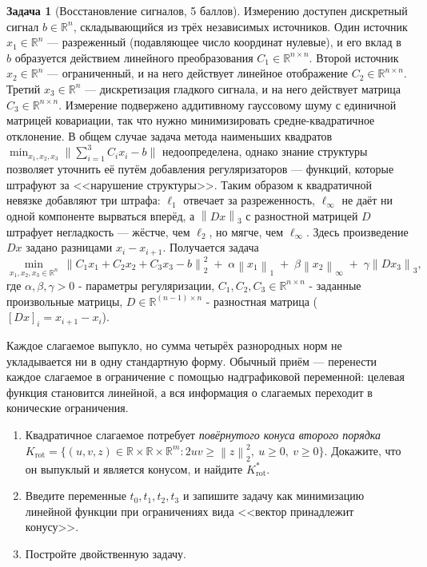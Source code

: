 \documentclass[11pt]{article}
\theoremstyle{definition}
\newtheorem{problem}{Задача}
\theoremstyle{starred}
\theoremstyle{definition}
\theoremstyle{remark}
\theoremstyle{plain}
\theoremstyle{definition}
\newcommand{\R}{\mathbb{R}}
\newcommand{\norm}[1]{\left\lVert #1 \right\rVert}
\begin{document}
\begin{problem}[Восстановление сигналов, 5 баллов]
Измерению доступен дискретный сигнал $b \in \R^n$, складывающийся из трёх независимых источников. Один источник $x_1  \in \R^n$ --- разреженный (подавляющее число координат нулевые), и его вклад в $b$ образуется действием линейного преобразования $C_1 \in \R^{n \times n}$. Второй источник $x_2  \in \R^n$ --- ограниченный, и на него действует линейное отображение $C_2  \in \R^{n \times n}$. Третий $x_3  \in \R^n$ --- дискретизация гладкого сигнала, и на него действует матрица $C_3  \in \R^{n \times n}$. Измерение подвержено аддитивному гауссовому шуму с единичной матрицей ковариации, так что нужно минимизировать средне-квадратичное отклонение. В общем случае задача метода наименьших квадратов $\min_{x_1, x_2, x_3} \|\sum_{i=1}^3 C_i x_i - b\|$ недоопределена, однако знание структуры позволяет уточнить её путём добавления регуляризаторов --- функций, которые штрафуют за <<нарушение структуры>>. Таким образом к квадратичной невязке добавляют три штрафа: $\ell_1$ отвечает за разреженность, $\ell_\infty$ не
даёт ни одной компоненте вырваться вперёд, а $\norm{Dx}_3$ с разностной матрицей $D$ штрафует негладкость --- жёстче, чем $\ell_2$, но мягче, чем $\ell_\infty$. Здесь произведение $Dx$ задано разницами $x_i - x_{i+1}$. Получается задача
\[
\min_{x_1, x_2, x_3 \in \R^n} \ \norm{C_1 x_1 + C_2 x_2 + C_3 x_3 - b}_2^{2}
\;+\; \alpha \norm{x_1}_1 \;+\; \beta \norm{x_2}_\infty \;+\; \gamma \norm{Dx_3}_3 ,
\]
где $\alpha, \beta, \gamma > 0$ - параметры регуляризации, $C_1, C_2, C_3\in \R^{n\times n}$ - заданные произвольные матрицы, $D \in \R^{(n-1)\times n}$ - разностная матрица ($[Dx]_i=x_{i+1} - x_i$).

Каждое слагаемое выпукло, но сумма четырёх разнородных норм не укладывается ни в одну стандартную
форму. Обычный приём --- перенести каждое слагаемое в ограничение с помощью надграфиковой
переменной: целевая функция становится линейной, а вся информация о слагаемых переходит в конические ограничения.
\begin{enumerate}[label=(\alph*), nosep]
  \item Квадратичное слагаемое потребует \emph{повёрнутого конуса второго порядка}
        $K_{\mathrm{rot}} = \{(u, v, z) \in \R \times \R \times \R^{m} : 2uv \ge \norm{z}_2^{2},\ u \ge 0,\ v \ge 0\}$.
        Докажите, что он выпуклый и является конусом, и найдите $K_{\mathrm{rot}}^{*}$.
  \item Введите переменные $t_0, t_1, t_2, t_3$ и запишите задачу как минимизацию линейной функции
        при ограничениях вида <<вектор принадлежит конусу>>. 
  \item Постройте двойственную задачу.
\end{enumerate}
\end{problem}
\end{document}
